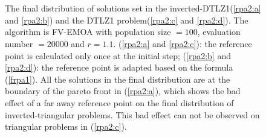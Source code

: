 \documentclass[conference]{IEEEtran}
\begin{document}
\begin{figure}[!t]
  \centering
  \quad
  \\
  \quad
  \\
  \caption{The final distribution of solutions set in the inverted-DTLZ1(\ref{rpa2:a} and \ref{rpa2:b}) 
  and the DTLZ1 problem(\ref{rpa2:c} and \ref{rpa2:d}).
  The algorithm is FV-EMOA with population size $= 100$, evaluation number $= 20000$ and $r=1.1$. 
  (\ref{rpa2:a} and \ref{rpa2:c}): the reference point is calculated only once at the initial step;
  (\ref{rpa2:b} and \ref{rpa2:d}): the reference point is adapted based on the formula (\ref{frpa1}).
  All the solutions in the final distribution are at the boundary of the pareto front in (\ref{rpa2:a}),
  which shows the bad effect of a far away reference point
  on the final distribution of inverted-triangular problems.
  This bad effect can not be observed on triangular problems in (\ref{rpa2:c}).
  }
  \label{rpa2}
\end{figure}
\end{document}
